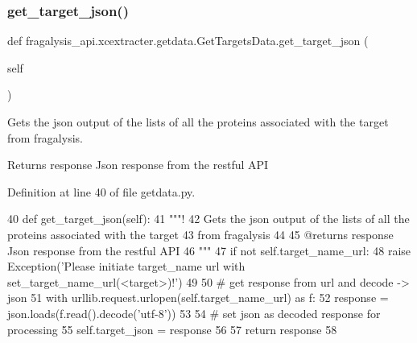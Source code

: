 \subsubsection{\texorpdfstring{get\+\_\+target\+\_\+json()}{get\_target\_json()}}
{\footnotesize\ttfamily def fragalysis\+\_\+api.\+xcextracter.\+getdata.\+Get\+Targets\+Data.\+get\+\_\+target\+\_\+json (\begin{DoxyParamCaption}\item[{}]{self }\end{DoxyParamCaption})}



Gets the json output of the lists of all the proteins associated with the target from fragalysis. 

\begin{DoxyReturn}{Returns}
response Json response from the restful A\+PI 
\end{DoxyReturn}


Definition at line 40 of file getdata.\+py.


\begin{DoxyCode}
40     \textcolor{keyword}{def }get\_target\_json(self):
41         \textcolor{stringliteral}{"""!}
42 \textcolor{stringliteral}{        Gets the json output of the lists of all the proteins associated with the target}
43 \textcolor{stringliteral}{        from fragalysis}
44 \textcolor{stringliteral}{}
45 \textcolor{stringliteral}{        @returns response Json response from the restful API}
46 \textcolor{stringliteral}{        """}
47         \textcolor{keywordflow}{if} \textcolor{keywordflow}{not} self.target\_name\_url:
48             \textcolor{keywordflow}{raise} Exception(\textcolor{stringliteral}{'Please initiate target\_name url with set\_target\_name\_url(<target>)!'})
49 
50         \textcolor{comment}{# get response from url and decode -> json}
51         with urllib.request.urlopen(self.target\_name\_url) \textcolor{keyword}{as} f:
52             response = json.loads(f.read().decode(\textcolor{stringliteral}{'utf-8'}))
53 
54         \textcolor{comment}{# set json as decoded response for processing}
55         self.target\_json = response
56 
57         \textcolor{keywordflow}{return} response
58 
\end{DoxyCode}
\mbox{\label{classfragalysis__api_1_1xcextracter_1_1getdata_1_1_get_targets_data_abf5179a2489b7edaa16dc6bc8c89f051}} 
